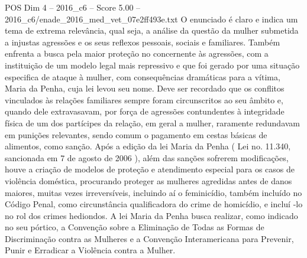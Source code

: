 \begin{textsample}{POS Dim 4 – 2016\_c6 – Score 5.00 – 2016\_c6/enade\_2016\_med\_vet\_07e2ff493e.txt}
O enunciado é claro e indica um tema de extrema relevância, qual seja, a análise da questão da mulher submetida a injustas agressões e os seus reflexos pessoais, sociais e familiares.
Também enfrenta a busca pela maior proteção no concernente às agressões, com a instituição de um modelo legal mais repressivo e que foi gerado por uma situação especifica de ataque à mulher, com consequências dramáticas para a vítima, Maria da Penha, cuja lei levou seu nome.
Deve ser recordado que os conflitos vinculados às relações familiares sempre foram circunscritos ao seu âmbito e, quando dele extravasavam, por força de agressões contundentes à integridade física de um dos partícipes da relação, em geral a mulher, raramente redundavam em punições relevantes, sendo comum o pagamento em cestas básicas de alimentos, como sanção.
Após a edição da lei Maria da Penha ( Lei no. 11.340, sancionada em 7 de agosto de 2006 ), além das sanções sofrerem modificações, houve a criação de modelos de proteção e atendimento especial para os casos de violência doméstica, procurando proteger as mulheres agredidas antes de danos maiores, muitas vezes irreversíveis, incluindo aí o feminicídio, também incluído no Código Penal, como circunstância qualificadora do crime de homicídio, e incluí -lo no rol dos crimes hediondos.
A lei Maria da Penha busca realizar, como indicado no seu pórtico, a Convenção sobre a Eliminação de Todas as Formas de Discriminação contra as Mulheres e a Convenção Interamericana para Prevenir, Punir e Erradicar a Violência contra a Mulher.

\end{textsample}
